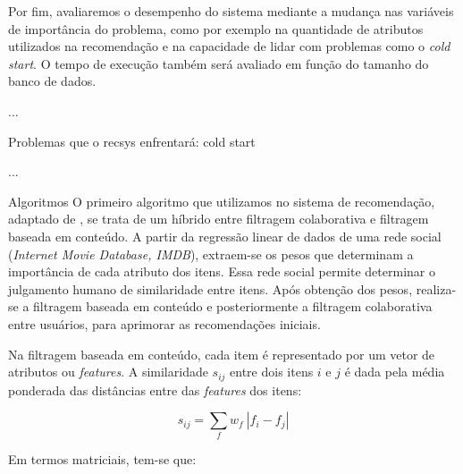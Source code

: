 Por fim, avaliaremos o desempenho do sistema mediante a mudança nas variáveis de importância do problema, como por exemplo na quantidade de atributos utilizados na recomendação e na capacidade de lidar com problemas como o \textit{cold start}. O tempo de execução também será avaliado em função do tamanho do banco de dados.

...

Problemas que o recsys enfrentará: cold start

...

Algoritmos
O primeiro algoritmo que utilizamos no sistema de recomendação, adaptado de  \cite{symeonidis2007feature}, se trata de um híbrido entre filtragem colaborativa e filtragem baseada em conteúdo. A partir da regressão linear de dados de uma rede social (\textit{Internet Movie Database, IMDB}), extraem-se os pesos que determinam a importância de cada atributo dos itens. Essa rede social permite determinar o julgamento humano de similaridade entre itens. Após obtenção dos pesos, realiza-se a filtragem baseada em conteúdo e posteriormente a filtragem colaborativa entre usuários, para aprimorar as recomendações iniciais.

Na filtragem baseada em conteúdo, cada item é representado por um vetor de atributos ou \textit{features}. A similaridade $s_{ij}$ entre dois itens $i$ e $j$ é dada pela média ponderada das distâncias entre das \textit{features} dos itens:

\begin{equation} 
    s_{ij} = \sum_{f}{w_f~\left|f_i-f_j\right|}
\end{equation}

Em termos matriciais, tem-se que:










